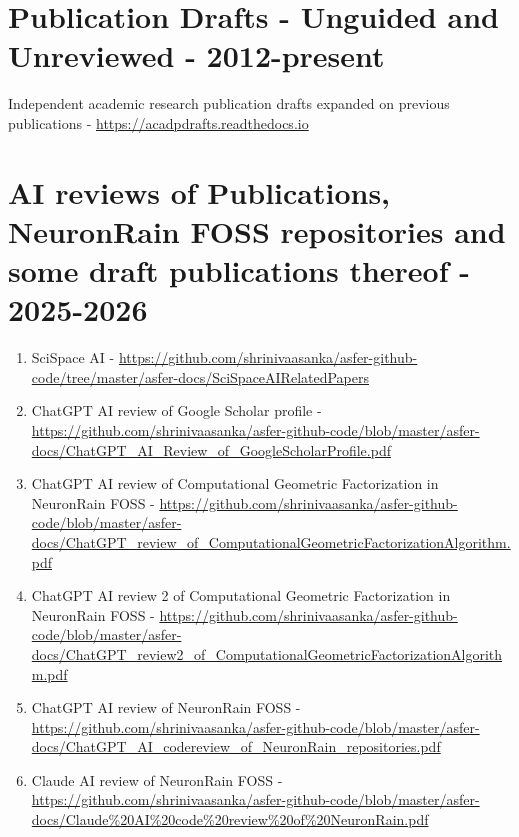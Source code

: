 \documentclass[11pt,onecolumn]{article}
\begin{document}
\section{Publication Drafts - Unguided and Unreviewed - 2012-present}
Independent academic research publication drafts expanded on previous publications - \url {https://acadpdrafts.readthedocs.io}

\section{AI reviews of Publications, NeuronRain FOSS repositories and some draft publications thereof - 2025-2026}
\begin{enumerate}
\item[$\bullet$] SciSpace AI - \url{https://github.com/shrinivaasanka/asfer-github-code/tree/master/asfer-docs/SciSpaceAIRelatedPapers} \\
\item[$\bullet$] ChatGPT AI review of Google Scholar profile - \url{https://github.com/shrinivaasanka/asfer-github-code/blob/master/asfer-docs/ChatGPT_AI_Review_of_GoogleScholarProfile.pdf} \\
\item[$\bullet$] ChatGPT AI review of Computational Geometric Factorization in NeuronRain FOSS - \url{https://github.com/shrinivaasanka/asfer-github-code/blob/master/asfer-docs/ChatGPT_review_of_ComputationalGeometricFactorizationAlgorithm.pdf} \\
\item[$\bullet$] ChatGPT AI review 2 of Computational Geometric Factorization in NeuronRain FOSS - \url{https://github.com/shrinivaasanka/asfer-github-code/blob/master/asfer-docs/ChatGPT_review2_of_ComputationalGeometricFactorizationAlgorithm.pdf} \\
\item[$\bullet$] ChatGPT AI review of NeuronRain FOSS - \url{https://github.com/shrinivaasanka/asfer-github-code/blob/master/asfer-docs/ChatGPT_AI_codereview_of_NeuronRain_repositories.pdf} \\
\item[$\bullet$] Claude AI review of NeuronRain FOSS - \url{https://github.com/shrinivaasanka/asfer-github-code/blob/master/asfer-docs/Claude%20AI%20code%20review%20of%20NeuronRain.pdf}
\end{enumerate}
\end{document}
